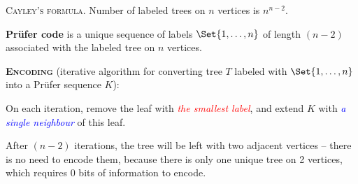 \documentclass[a4paper,10pt]{article}
\begin{document}
\begin{terms}
    \item \textsc{Cayley's formula}. Number of labeled trees on $n$ vertices is $n^{n-2}$.

    \item \textbf{Pr\"{u}fer code} is a unique sequence of labels $\Set{1,\dotsc,n}$ of length $(n-2)$ associated with the labeled tree on $n$ vertices.
    \begin{terms}
        \item \textbf{\textsc{Encoding}} (iterative algorithm for converting tree $T$ labeled with $\Set{1,\dotsc,n}$ into a Pr\"{u}fer sequence $K$):
        \begin{terms}
            \item On each iteration, remove the leaf with \textcolor{red}{\emph{the smallest label}}, and extend $K$ with \textcolor{blue}{\emph{a single neighbour}} of this leaf.
            \item After $(n-2)$ iterations, the tree will be left with two adjacent vertices \--- there is no need to encode them, because there is only one unique tree on 2 vertices, which requires 0 bits of information to encode.
        \end{terms}

        \begingroup
        \def\Dist{.5}
        \def\LabelY{-1.1}


\end{terms}
\end{terms}
\end{document}
